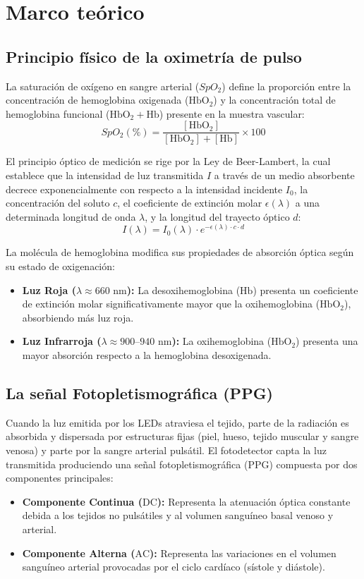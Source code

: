 \section{Marco teórico}
\subsection{Principio físico de la oximetría de pulso}
La saturación de oxígeno en sangre arterial ($SpO_2$) define la proporción entre la concentración de hemoglobina oxigenada ($\text{HbO}_2$) y la concentración total de hemoglobina funcional ($\text{HbO}_2 + \text{Hb}$) presente en la muestra vascular:
\begin{equation}
    SpO_2 (\%) = \frac{[\text{HbO}_2]}{[\text{HbO}_2] + [\text{Hb}]} \times 100
\end{equation}

El principio óptico de medición se rige por la Ley de Beer-Lambert, la cual establece que la intensidad de luz transmitida $I$ a través de un medio absorbente decrece exponencialmente con respecto a la intensidad incidente $I_0$, la concentración del soluto $c$, el coeficiente de extinción molar $\epsilon(\lambda)$ a una determinada longitud de onda $\lambda$, y la longitud del trayecto óptico $d$:
\begin{equation}
    I(\lambda) = I_0(\lambda) \cdot e^{-\epsilon(\lambda) \cdot c \cdot d}
\end{equation}

La molécula de hemoglobina modifica sus propiedades de absorción óptica según su estado de oxigenación:
\begin{itemize}
    \item \textbf{Luz Roja ($\lambda \approx 660\text{ nm}$):} La desoxihemoglobina ($\text{Hb}$) presenta un coeficiente de extinción molar significativamente mayor que la oxihemoglobina ($\text{HbO}_2$), absorbiendo más luz roja.
    \item \textbf{Luz Infrarroja ($\lambda \approx 900\text{--}940\text{ nm}$):} La oxihemoglobina ($\text{HbO}_2$) presenta una mayor absorción respecto a la hemoglobina desoxigenada.
\end{itemize}

\subsection{La señal Fotopletismográfica (PPG)}
Cuando la luz emitida por los LEDs atraviesa el tejido, parte de la radiación es absorbida y dispersada por estructuras fijas (piel, hueso, tejido muscular y sangre venosa) y parte por la sangre arterial pulsátil. El fotodetector capta la luz transmitida produciendo una señal fotopletismográfica (PPG) compuesta por dos componentes principales:
\begin{itemize}
    \item \textbf{Componente Continua ($\text{DC}$):} Representa la atenuación óptica constante debida a los tejidos no pulsátiles y al volumen sanguíneo basal venoso y arterial.
    \item \textbf{Componente Alterna ($\text{AC}$):} Representa las variaciones en el volumen sanguíneo arterial provocadas por el ciclo cardíaco (sístole y diástole).
\end{itemize}

